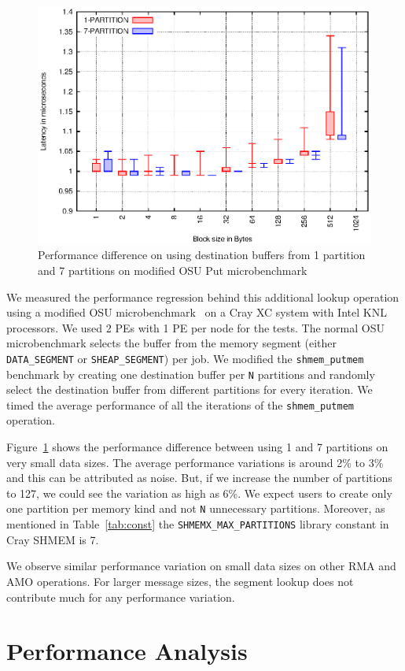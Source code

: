 \begin{figure}[h!]
    \vspace{-30pt}
    \centering
    \includegraphics[width=\linewidth]{graph/osu-put.eps}
    \caption{Performance difference on using destination buffers
    from 1 partition and 7 partitions
    on modified OSU Put microbenchmark}
    \label{graph:lookup}
    \vspace{-20pt}
\end{figure}

We measured the performance regression behind this additional lookup
operation using a modified OSU microbenchmark~\cite{pgas-benchmarks}
on a Cray XC system with Intel KNL processors. We used 2 PEs with 1
PE per node for the tests.
The normal OSU microbenchmark selects the buffer from the memory
segment (either \texttt{DATA\_SEGMENT} or \texttt{SHEAP\_SEGMENT})
per job. We modified the \texttt{shmem\_putmem} benchmark by creating
one destination buffer per \texttt{N} partitions and randomly select
the destination buffer from different partitions for every iteration.
We timed the average performance of all the iterations of the
\texttt{shmem\_putmem} operation.

Figure~\ref{graph:lookup} shows the
performance difference between using 1 and 7 partitions on very small
data sizes. The average performance variations is around 2\% to
3\% and this can be attributed as noise. But, if we increase
the number of partitions to 127, we could see the variation as high
as 6\%. We expect users to create only one partition per memory kind
and not \texttt{N} unnecessary partitions. Moreover, as mentioned in
Table~\ref{tab:const} the \texttt{SHMEMX\_MAX\_PARTITIONS} library
constant in Cray SHMEM is 7.

We observe similar performance variation on small data sizes on other
RMA and AMO operations. For larger message sizes, the segment lookup
does not contribute much for any performance variation.

\section{Performance Analysis}
\label{src:perf}